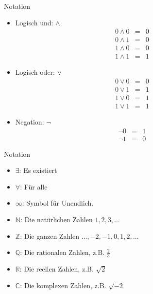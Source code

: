 \documentclass[german]{beamer}
\newcommand{\bq}{\begin{eqnarray*}}
\newcommand{\eq}{\end{eqnarray*}}
\begin{document}
\begin{frame}{Notation}

\begin{itemize}

\item 
Logisch und: \alert{$\wedge$}
{\footnotesize
\bq
 0 \wedge 0 & = & 0
 \nonumber \\
 0 \wedge 1 & = & 0
 \nonumber \\
 1 \wedge 0 & = & 0
 \nonumber \\
 1 \wedge 1 & = & 1
\eq
}
\pause

\item
Logisch oder: \alert{$\vee$}
{\footnotesize
\bq
 0 \vee 0 & = & 0
 \nonumber \\
 0 \vee 1 & = & 1
 \nonumber \\
 1 \vee 0 & = & 1
 \nonumber \\
 1 \vee 1 & = & 1
\eq
}
\pause

\item
Negation: \alert{$\neg$}
{\footnotesize
\bq
 \neg 0 & = & 1
 \nonumber \\
 \neg 1 & = & 0
\eq
}

\end{itemize}

\end{frame}

\begin{frame}{Notation}

\begin{itemize}

\item
\alert{$\exists$}: Es existiert
\pause

\item
\alert{$\forall$}: F\"ur alle
\pause

\item
\alert{$\infty$}: Symbol f\"ur Unendlich.
\pause

\item
\alert{$\mathbb{N}$}: Die nat\"urlichen Zahlen $1,2,3,\dots$
\pause

\item
\alert{$\mathbb{Z}$}: Die ganzen Zahlen $\dots,-2,-1,0,1,2,\dots$
\pause

\item
\alert{$\mathbb{Q}$}: Die rationalen Zahlen, z.B. $\frac{2}{3}$
\pause

\item
\alert{$\mathbb{R}$}: Die reellen Zahlen, z.B. $\sqrt{2}$
\pause

\item
\alert{$\mathbb{C}$}: Die komplexen Zahlen, z.B. $\sqrt{-2}$

\end{itemize}

\end{frame}
\end{document}
